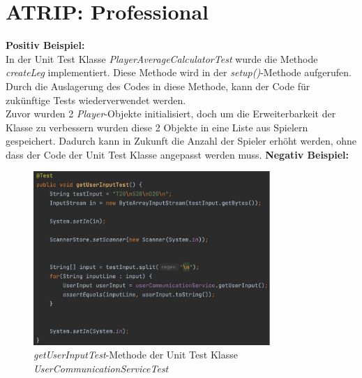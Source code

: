 \section{ATRIP: Professional}
\textbf{Positiv Beispiel:}\\

In der Unit Test Klasse \textit{PlayerAverageCalculatorTest} wurde die Methode \textit{createLeg} implementiert. Diese Methode wird in der \textit{setup()}-Methode aufgerufen. Durch die Auslagerung des Codes in diese Methode, kann der Code für zukünftige Tests wiederverwendet werden.\\

Zuvor wurden 2 \textit{Player}-Objekte initialisiert, doch um die Erweiterbarkeit der Klasse zu verbessern wurden diese 2 Objekte in eine Liste aus Spielern gespeichert. Dadurch kann in Zukunft die Anzahl der Spieler erhöht werden, ohne dass der Code der Unit Test Klasse angepasst werden muss.\newpage
\textbf{Negativ Beispiel:}\\
\begin{figure}[ht]
    \centering
    \includegraphics[width=0.8\textwidth]{Bilder/getUserInputTestCode.png}
    \caption{\textit{getUserInputTest}-Methode der Unit Test Klasse \textit{UserCommunicationServiceTest}}
    \label{fig:getUserInputTest-function}
\end{figure}\\
